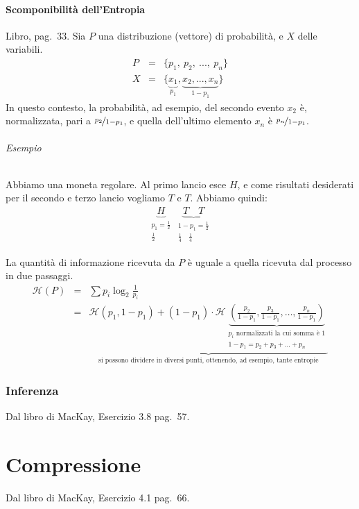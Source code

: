\subsubsection{Scomponibilità dell'Entropia}
Libro, pag.~33. Sia $P$ una distribuzione (vettore) di probabilità, e $X$ delle variabili.
\begin{eqnarray*}
    P &=& \{ p_1,~p_2,~...,~p_n\}\\
    X &=& \{ \underbrace{x_1}_{p_1},\underbrace{x_2,...,x_n}_{1-p_1}\}
\end{eqnarray*}
In questo contesto, la probabilità, ad esempio, del secondo evento $x_2$ è, normalizzata, pari a $\nicefrac{p_2}{1-p_1}$, e quella dell'ultimo elemento $x_n$ è $\nicefrac{p_n}{1-p_1}$.

\subparagraph{Esempio} Abbiamo una moneta regolare. Al primo lancio esce $H$, e come risultati desiderati per il secondo e terzo lancio vogliamo $T$ e $T$. Abbiamo quindi:
\begin{eqnarray*}
    \underbrace{H}_{\substack{p_1=\frac{1}{2}\\\frac{1}{2}}}~\underbrace{T\quad T}_{\substack{1-p_1=\frac{1}{2}\\\frac{1}{4}\quad\frac{1}{4}}}
\end{eqnarray*}

La quantità di informazione ricevuta da $P$ è uguale a quella ricevuta dal processo in due passaggi.
\begin{eqnarray*}
    \mathcal{H}(P)  & = & \sum p_i\log_2\frac{1}{p_i}\\
                    & = & \underbrace{\mathcal{H}(p_1,1-p_1)+(1-p_1)\cdot\mathcal{H}\underbrace{\left(\frac{p_2}{1-p_1},\frac{p_3}{1-p_1},\dots,\frac{p_n}{1-p_1}\right)}_{\substack{\text{$p_i$ normalizzati la cui somma è 1}\\1-p_1=p_2+p_3+\dots+p_n}}}_{\text{si possono dividere in diversi punti, ottenendo, ad esempio, tante entropie}}
\end{eqnarray*}



\subsection{Inferenza}
Dal libro di MacKay, Esercizio 3.8 pag.~57.


\chapter{Compressione}
Dal libro di MacKay, Esercizio 4.1 pag.~66.


